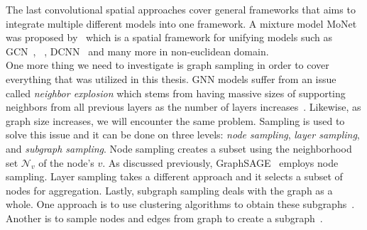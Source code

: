 The last convolutional spatial approaches cover general frameworks that aims to integrate multiple different models into one framework. A mixture model MoNet was proposed by~\cite{GeometricDeepLearningOnGraphsAndManifolds_Monti} which is a spatial framework for unifying models such as GCN~\cite{GCN_Kipf}, ~\cite{GeodesicCNNsOnRiemannManifolds_Masci}, DCNN~\cite{DCNN_Atwood} and many more in non-euclidean domain.\\
One more thing we need to investigate is graph sampling in order to cover everything that was utilized in this thesis. GNN models suffer from an issue called \emph{neighbor explosion} which stems from having massive sizes of supporting neighbors from all previous layers as the number of layers increases~\cite{GNNsAReview_Zhou}. Likewise, as graph size increases, we will encounter the same problem. Sampling is used to solve this issue and it can be done on three levels: \emph{node sampling}, \emph{layer sampling}, and \emph{subgraph sampling}. Node sampling creates a subset using the neighborhood set $\mathcal{N}_v$ of the node's $v$. As discussed previously, GraphSAGE~\parencite{GraphSAGE_Hamilton} employs node sampling. Layer sampling takes a different approach and it selects a subset of nodes for aggregation. Lastly, subgraph sampling deals with the graph as a whole. One approach is to use clustering algorithms to obtain these subgraphs~\parencite{ClusterGCN_Chiang}. Another is to sample nodes and edges from graph to create a subgraph~\parencite{GraphSAINT_Zeng}.\\

